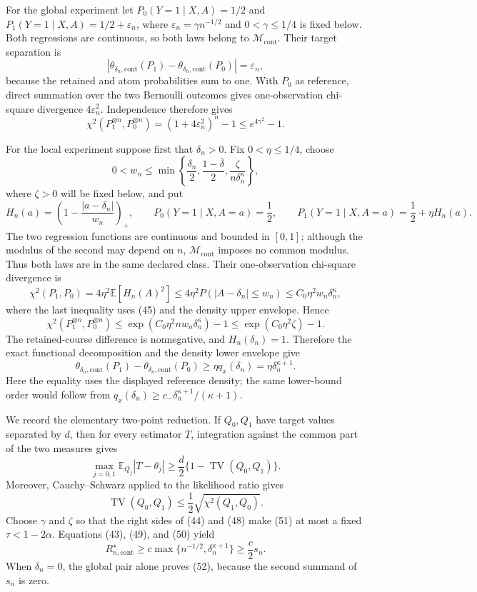 For the global experiment let \(P_0(Y=1\mid X,A)=1/2\) and \(P_1(Y=1\mid X,A)=1/2+\varepsilon_n\), where \(\varepsilon_n=\gamma n^{-1/2}\) and \(0<\gamma\leq1/4\) is fixed below.  Both regressions are continuous, so both laws belong to \(\mathcal M_{\mathrm{cont}}\).  Their target separation is
\[
 |\theta_{\delta_n,\mathrm{cont}}(P_1)-\theta_{\delta_n,\mathrm{cont}}(P_0)|=\varepsilon_n, \tag{43}
\]
because the retained and atom probabilities sum to one.  With \(P_0\) as reference, direct summation over the two Bernoulli outcomes gives one-observation chi-square divergence \(4\varepsilon_n^2\).  Independence therefore gives
\[
 \chi^2(P_1^{\otimes n},P_0^{\otimes n})
 =(1+4\varepsilon_n^2)^n-1\leq e^{4\gamma^2}-1. \tag{44}
\]

For the local experiment suppose first that \(\delta_n>0\).  Fix \(0<\eta\leq1/4\), choose
\[
 0<w_n\leq\min\left\{\frac{\delta_n}{2},\frac{1-\bar\delta}{2},
 \frac{\zeta}{n\delta_n^\kappa}\right\}, \tag{45}
\]
where \(\zeta>0\) will be fixed below, and put
\[
 H_n(a)=\left(1-\frac{|a-\delta_n|}{w_n}\right)_+,
 \qquad
 P_0(Y=1\mid X,A=a)=\frac12,
 \qquad
 P_1(Y=1\mid X,A=a)=\frac12+\eta H_n(a). \tag{46}
\]
The two regression functions are continuous and bounded in \([0,1]\); although the modulus of the second may depend on \(n\), \(\mathcal M_{\mathrm{cont}}\) imposes no common modulus.  Thus both laws are in the same declared class.  Their one-observation chi-square divergence is
\[
 \chi^2(P_1,P_0)=4\eta^2\mathbb E[H_n(A)^2]
 \leq4\eta^2P(|A-\delta_n|\leq w_n)
 \leq C_0\eta^2w_n\delta_n^\kappa, \tag{47}
\]
where the last inequality uses (45) and the density upper envelope.  Hence
\[
 \chi^2(P_1^{\otimes n},P_0^{\otimes n})
 \leq\exp(C_0\eta^2nw_n\delta_n^\kappa)-1
 \leq\exp(C_0\eta^2\zeta)-1. \tag{48}
\]
The retained-course difference is nonnegative, and \(H_n(\delta_n)=1\).  Therefore the exact functional decomposition and the density lower envelope give
\[
 \theta_{\delta_n,\mathrm{cont}}(P_1)-\theta_{\delta_n,\mathrm{cont}}(P_0)
 \geq\eta q_x(\delta_n)
 =\eta\delta_n^{\kappa+1}. \tag{49}
\]
Here the equality uses the displayed reference density; the same lower-bound order would follow from \(q_x(\delta_n)\geq c_-\delta_n^{\kappa+1}/(\kappa+1)\).

We record the elementary two-point reduction.  If \(Q_0,Q_1\) have target values separated by \(d\), then for every estimator \(T\), integration against the common part of the two measures gives
\[
 \max_{j=0,1}\mathbb E_{Q_j}|T-\theta_j|
 \geq\frac d2\{1-\operatorname{TV}(Q_0,Q_1)\}. \tag{50}
\]
Moreover, Cauchy--Schwarz applied to the likelihood ratio gives
\[
 \operatorname{TV}(Q_0,Q_1)
 \leq\frac12\sqrt{\chi^2(Q_1,Q_0)}. \tag{51}
\]
Choose \(\gamma\) and \(\zeta\) so that the right sides of (44) and (48) make (51) at most a fixed \(\tau<1-2\alpha\).  Equations (43), (49), and (50) yield
\[
 R_{n,\mathrm{cont}}^\star
 \geq c\max\{n^{-1/2},\delta_n^{\kappa+1}\}
 \geq\frac c2s_n. \tag{52}
\]
When \(\delta_n=0\), the global pair alone proves (52), because the second summand of \(s_n\) is zero.

